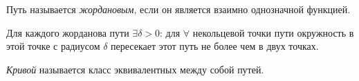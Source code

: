 \begin{definition}
	Путь называется \emph{жордановым}, если он является взаимно однозначной функцией.
\end{definition}

\begin{lemma}
	Для каждого жорданова пути $\exists \delta > 0$: для $\forall $ некольцевой точки пути окружность в этой точке с радиусом $\delta $ пересекает этот путь не более чем в двух точках.
\end{lemma}

\begin{definition}[Кривая]
	\emph{Кривой} называется класс эквивалентных между собой путей.
\end{definition}
